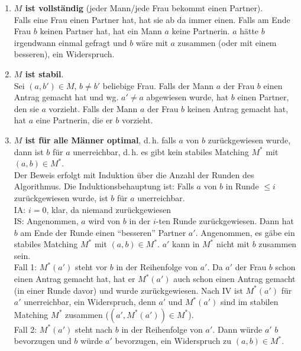 \begin{Beweis}
    \begin{enumerate}
        \item
        \textbf{$M$ ist vollständig} (jeder Mann/jede Frau bekommt einen
        Partner). \\
        Falls eine Frau einen Partner hat, hat sie ab da immer einen.
        Falls am Ende Frau $b$ keinen Partner hat, hat ein Mann $a$ keine
        Partnerin.
        $a$ hätte $b$ irgendwann einmal gefragt und $b$ wäre mit $a$ zusammen
        (oder mit einem besseren), ein Widerspruch.
        
        \item
        \textbf{$M$ ist stabil}. \\
        Sei $(a, b') \in M$, $b \not= b'$ beliebige Frau.
        Falls der Mann $a$ der Frau $b$ einen Antrag gemacht hat und wg.
        $a' \not= a$ abgewiesen wurde, hat $b$ einen Partner, den sie $a$
        vorzieht.
        Falls der Mann $a$ der Frau $b$ keinen Antrag gemacht hat,
        hat $a$ eine Partnerin, die er $b$ vorzieht.
        
        \item
        \textbf{$M$ ist für alle Männer optimal}, d.\,h.
        falls $a$ von $b$ zurückgewiesen wurde, dann ist $b$ für $a$
        unerreichbar, d.\,h. es gibt kein stabiles Matching $M^\ast$
        mit $(a, b) \in M^\ast$. \\
        Der Beweis erfolgt mit Induktion über die Anzahl der Runden
        des Algorithmus. Die Induktionsbehauptung ist:
        Falls $a$ von $b$ in Runde $\le i$ zurückgewiesen wurde, ist $b$
        für $a$ unerreichbar. \\
        IA: $i = 0$, klar, da niemand zurückgewiesen \\
        IS: Angenommen, $a$ wird von $b$ in der $i$-ten Runde zurückgewiesen.
        Dann hat $b$ am Ende der Runde einen "`besseren"' Partner $a'$.
        Angenommen, es gäbe ein stabiles Matching $M^\ast$ mit
        $(a, b) \in M^\ast$.
        $a'$ kann in $M^\ast$ nicht mit $b$ zusammen sein. \\
        Fall 1: $M^\ast(a')$ steht vor $b$ in der Reihenfolge von $a'$.
        Da $a'$ der Frau $b$ schon einen Antrag gemacht hat, hat er
        $M^\ast(a')$ auch schon einen Antrag gemacht
        (in einer Runde davor) und wurde zurückgewiesen.
        Nach IV ist $M^\ast(a')$ für $a'$ unerreichbar, ein Widerspruch,
        denn $a'$ und $M^\ast(a')$ sind im stabilen Matching $M^\ast$
        zusammen ($(a', M^\ast(a')) \in M^\ast$). \\
        Fall 2: $M^\ast(a')$ steht nach $b$ in der Reihenfolge von $a'$.
        Dann würde $a'$ $b$ bevorzugen und $b$ würde $a'$ bevorzugen,
        ein Widerspruch zu $(a, b) \in M^\ast$.
    \end{enumerate}
\end{Beweis}

\pagebreak
